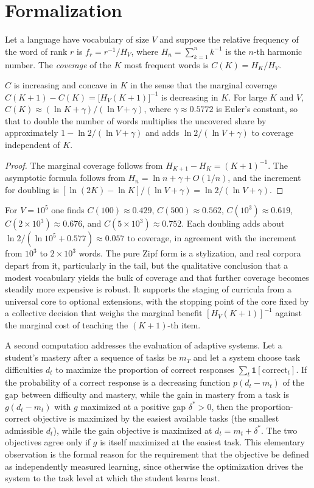 \section*{Formalization}

Let a language have vocabulary of size $V$ and suppose the relative frequency of the word of rank $r$ is $f_r=r^{-1}/H_V$, where $H_n=\sum_{k=1}^n k^{-1}$ is the $n$-th harmonic number. The \emph{coverage} of the $K$ most frequent words is $C(K)=H_K/H_V$.

\begin{proposition}
$C$ is increasing and concave in $K$ in the sense that the marginal coverage $C(K+1)-C(K)=\bigl[H_V(K+1)\bigr]^{-1}$ is decreasing in $K$. For large $K$ and $V$, $C(K)\approx(\ln K+\gamma)/(\ln V+\gamma)$, where $\gamma\approx0.5772$ is Euler's constant, so that to double the number of words multiplies the uncovered share by approximately $1-\ln 2/(\ln V+\gamma)$ and adds $\ln2/(\ln V+\gamma)$ to coverage independent of $K$.
\end{proposition}

\begin{proof}
The marginal coverage follows from $H_{K+1}-H_K=(K+1)^{-1}$. The asymptotic formula follows from $H_n=\ln n+\gamma+O(1/n)$, and the increment for doubling is $[\ln(2K)-\ln K]/(\ln V+\gamma)=\ln2/(\ln V+\gamma)$.
\end{proof}

For $V=10^5$ one finds $C(100)\approx0.429$, $C(500)\approx0.562$, $C(10^3)\approx0.619$, $C(2\times10^3)\approx0.676$, and $C(5\times10^3)\approx0.752$. Each doubling adds about $\ln2/(\ln10^5+0.577)\approx0.057$ to coverage, in agreement with the increment from $10^3$ to $2\times10^3$ words. The pure Zipf form is a stylization, and real corpora depart from it, particularly in the tail, but the qualitative conclusion that a modest vocabulary yields the bulk of coverage and that further coverage becomes steadily more expensive is robust. It supports the staging of curricula from a universal core to optional extensions, with the stopping point of the core fixed by a collective decision that weighs the marginal benefit $[H_V(K+1)]^{-1}$ against the marginal cost of teaching the $(K+1)$-th item.

A second computation addresses the evaluation of adaptive systems. Let a student's mastery after a sequence of tasks be $m_T$ and let a system choose task difficulties $d_t$ to maximize the proportion of correct responses $\sum_t\mathbf 1[\text{correct}_t]$. If the probability of a correct response is a decreasing function $p(d_t-m_t)$ of the gap between difficulty and mastery, while the gain in mastery from a task is $g(d_t-m_t)$ with $g$ maximized at a positive gap $\delta^\ast>0$, then the proportion-correct objective is maximized by the easiest available tasks (the smallest admissible $d_t$), while the gain objective is maximized at $d_t=m_t+\delta^\ast$. The two objectives agree only if $g$ is itself maximized at the easiest task. This elementary observation is the formal reason for the requirement that the objective be defined as independently measured learning, since otherwise the optimization drives the system to the task level at which the student learns least.
